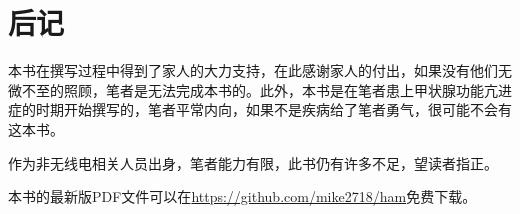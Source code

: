 \chapter*{后记}

本书在撰写过程中得到了家人的大力支持，在此感谢家人的付出，如果没有他们无微不至的照顾，笔者是无法完成本书的。此外，本书是在笔者患上甲状腺功能亢进症的时期开始撰写的，笔者平常内向，如果不是疾病给了笔者勇气，很可能不会有这本书。

作为非无线电相关人员出身，笔者能力有限，此书仍有许多不足，望读者指正。

本书的最新版PDF文件可以在\url{https://github.com/mike2718/ham}免费下载。
